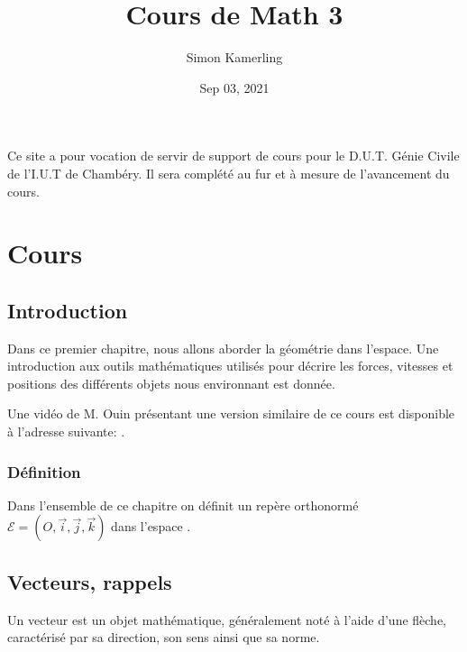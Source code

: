 \documentclass[letterpaper,10pt,english]{jupyterBook}
\title{Cours de Math 3}
\date{Sep 03, 2021}
\author{Simon Kamerling}
\begin{document}
\pagestyle{empty}
\sphinxmaketitle
\pagestyle{plain}
\sphinxtableofcontents
\pagestyle{normal}
\label{\detokenize{intro::doc}}


\sphinxAtStartPar
Ce site a pour vocation de servir de support de cours pour le D.U.T. Génie Civile de l’I.U.T de Chambéry. Il sera complété au fur et à mesure de l’avancement du cours.


\chapter{Cours}
\label{\detokenize{Part1/Cours:cours}}\label{\detokenize{Part1/Cours::doc}}

\section{Introduction}
\label{\detokenize{Part1/Cours:introduction}}
\sphinxAtStartPar
Dans ce premier chapitre, nous allons aborder la géométrie dans l’espace. Une introduction aux outils mathématiques utilisés pour décrire les forces, vitesses et positions des différents objets nous environnant est donnée.

\sphinxAtStartPar
Une vidéo de M. Ouin présentant une version similaire de ce cours est disponible à l’adresse suivante:  .


\subsection{Définition}
\label{\detokenize{Part1/Cours:definition}}
\sphinxAtStartPar
Dans l’ensemble de ce chapitre on définit un repère orthonormé \(\mathcal{E} = (O,\vec{i},\vec{j},\vec{k})\) dans l’espace .


\section{Vecteurs, rappels}
\label{\detokenize{Part1/Cours:vecteurs-rappels}}
\sphinxAtStartPar
{} Un vecteur est un objet mathématique, généralement noté à l’aide d’une flèche, caractérisé par sa direction, son sens ainsi que sa norme.
\end{document}
